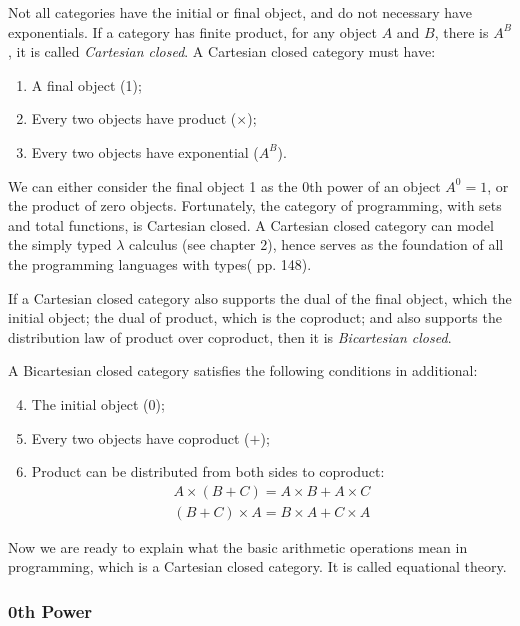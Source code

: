 \documentclass[b5paper]{article}
\begin{document}
Not all categories have the initial or final object, and do not necessary have exponentials. If a category has finite product, for any object $A$ and $B$, there is $A^B$, it is called {\em Cartesian closed}. A Cartesian closed category must have:

\begin{enumerate}
\item A final object (1);
\item Every two objects have product ($\times$);
\item Every two objects have exponential ($A^B$).
\end{enumerate}

We can either consider the final object 1 as the 0th power of an object $A^0 = 1$, or the product of zero objects. Fortunately, the category of programming, with sets and total functions, is Cartesian closed. A Cartesian closed category can model the simply typed $\lambda$ calculus (see chapter 2), hence serves as the foundation of all the programming languages with types(\cite{Milewski2018} pp. 148).

If a Cartesian closed category also supports the dual of the final object, which the initial object; the dual of product, which is the coproduct; and also supports the distribution law of product over coproduct, then it is {\em Bicartesian closed}.

A Bicartesian closed category satisfies the following conditions in additional:
\begin{enumerate}
  \setcounter{enumi}{3}
  \item The initial object (0);
  \item Every two objects have coproduct ($+$);
  \item Product can be distributed from both sides to coproduct:
  \[
  \begin{array}{l}
  A \times (B + C) = A \times B + A \times C \\
  (B + C) \times A = B \times A + C \times A
  \end{array}
  \]
\end{enumerate}

 
Now we are ready to explain what the basic arithmetic operations mean in programming, which is a Cartesian closed category. It is called equational theory.

\subsubsection{0th Power}
\end{document}
